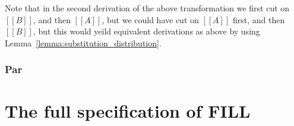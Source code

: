 \documentclass{article}
\begin{document}
Note that in the second derivation of the above transformation we
first cut on $[[B]]$, and then $[[A]]$, but we could have cut on
$[[A]]$ first, and then $[[B]]$, but this would yeild equivalent
derivations as above by using
Lemma~\ref{lemma:substitution_distribution}.

\subsubsection{Par}
\label{subsec:par}











\appendix

\section{The full specification of FILL}
\label{sec:fill_specification}
\FILLall{}
\end{document}

